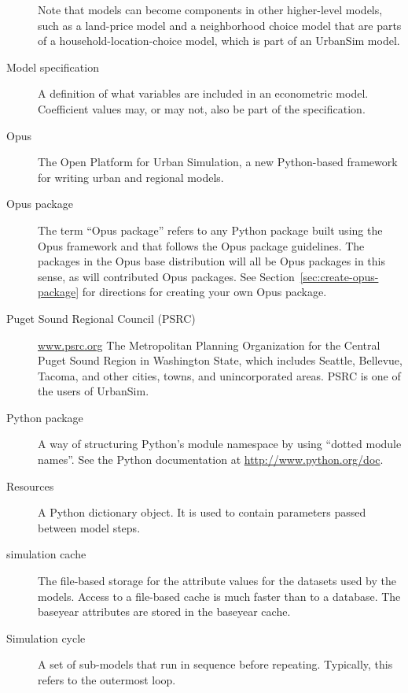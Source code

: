 \begin{description}
Note that models can become components in other higher-level models, such as a
land-price model and a neighborhood choice model that are parts of a
household-location-choice model, which is part of an UrbanSim model.

\item[Model specification] 
A definition of what variables are included in an econometric
model.  Coefficient values may, or may not, also be part of the
specification.

\item[Opus]  The Open Platform for Urban Simulation, a new
Python-based framework for writing urban and regional models.

\item[Opus package]  The term ``Opus package'' refers to 
any Python package built using the Opus framework and that follows
the Opus package guidelines.  The packages in the Opus base distribution
will all be Opus packages in this sense, as will contributed Opus packages. See
Section~\ref{sec:create-opus-package} for directions for creating your own Opus
package. 

\item[Puget Sound Regional Council (PSRC)]
\url{www.psrc.org}
The Metropolitan Planning Organization for the Central Puget Sound Region in Washington
State, which includes Seattle, Bellevue, Tacoma, and other cities, towns, and unincorporated 
areas.  PSRC is one of the users of UrbanSim. 

\item[Python package]
A way of structuring Python's module namespace by using ``dotted module
names''.  See the Python documentation at \url{http://www.python.org/doc}.

\item[Resources]  
A Python dictionary object.  It is used to contain parameters passed
between model steps.

\item[simulation cache]
The file-based storage for the attribute values for the datasets used by the
models. Access to a file-based cache is much faster than to a database.  The
baseyear attributes are stored in the baseyear cache.

\item[]\item[Simulation cycle] 
A set of sub-models that run in sequence before repeating.
Typically, this refers to the outermost loop.


\end{description}
